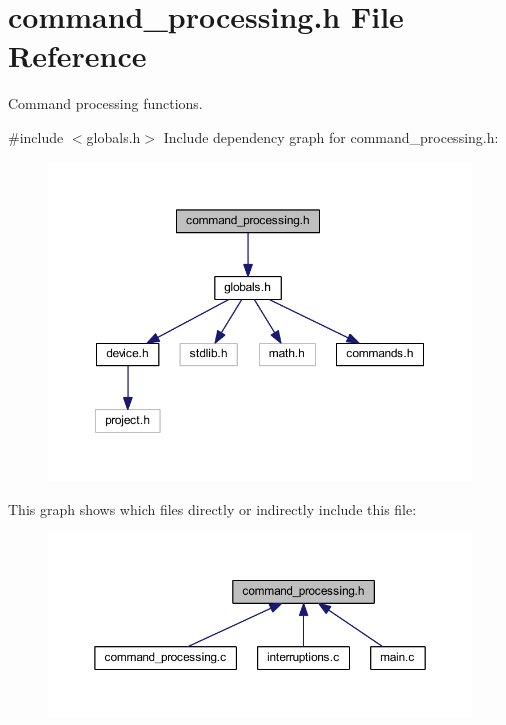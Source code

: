 \section{command\+\_\+processing.\+h File Reference}
\label{command__processing_8h}


Command processing functions.  


{\ttfamily \#include $<$globals.\+h$>$}\newline
Include dependency graph for command\+\_\+processing.\+h\+:\nopagebreak
\begin{figure}[H]
\begin{center}
\leavevmode
\includegraphics[width=350pt]{command__processing_8h__incl}
\end{center}
\end{figure}
This graph shows which files directly or indirectly include this file\+:\nopagebreak
\begin{figure}[H]
\begin{center}
\leavevmode
\includegraphics[width=350pt]{command__processing_8h__dep__incl}
\end{center}
\end{figure}
